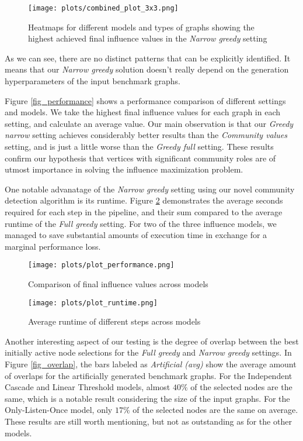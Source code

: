 \documentclass[pdflatex,sn-mathphys-ay]{sn-jnl}
\begin{document}
\begin{figure}[ht]
\centering
\texttt{[image: plots/combined\_plot\_3x3.png]}
\caption{Heatmaps for different models and types of graphs showing the highest achieved final influence values in the \textit{Narrow greedy} setting}
\label{fig_performance_models_parameters}
\end{figure}

As we can see, there are no distinct patterns that can be explicitly identified. It means that our \textit{Narrow greedy} solution doesn't really depend on the generation hyperparameters of the input benchmark graphs.

Figure \ref{fig_performance} shows a performance comparison of different settings and models. We take the highest final influence values for each graph in each setting, and calculate an average value. Our main observation is that our \textit{Greedy narrow} setting achieves considerably better results than the \textit{Community values} setting, and is just a little worse than the \textit{Greedy full} setting. These results confirm our hypothesis that vertices with significant community roles are of utmost importance in solving the influence maximization problem.

One notable advanatage of the \textit{Narrow greedy} setting using our novel community detection algorithm is its runtime. Figure \ref{fig_runtimes} demonstrates the average seconds required for each step in the pipeline, and their sum compared to the average runtime of the \textit{Full greedy} setting. For two of the three influence models, we managed to save substantial amounts of execution time in exchange for a marginal performance loss.

\begin{figure}[ht]
\centering
\begin{minipage}[b]{0.45\textwidth}
\texttt{[image: plots/plot\_performance.png]}
\caption{Comparison of final influence values across models}
\label{fig_performance}
\end{minipage}
\hfill
\begin{minipage}[b]{0.45\textwidth}
\texttt{[image: plots/plot\_runtime.png]}
\caption{Average runtime of different steps across models}
\label{fig_runtimes}
\end{minipage}
\end{figure}

Another interesting aspect of our testing is the degree of overlap between the best initially active node selections for the \textit{Full greedy} and \textit{Narrow greedy} settings. In Figure \ref{fig_overlap}, the bars labeled as \textit{Artificial (avg)} show the average amount of overlaps for the artificially generated benchmark graphs. For the Independent Cascade and Linear Threshold models, almost $40\%$ of the selected nodes are the same, which is a notable result considering the size of the input graphs. For the Only-Listen-Once model, only $17\%$ of the selected nodes are the same on average. These results are still worth mentioning, but not as outstanding as for the other models.
\end{document}
